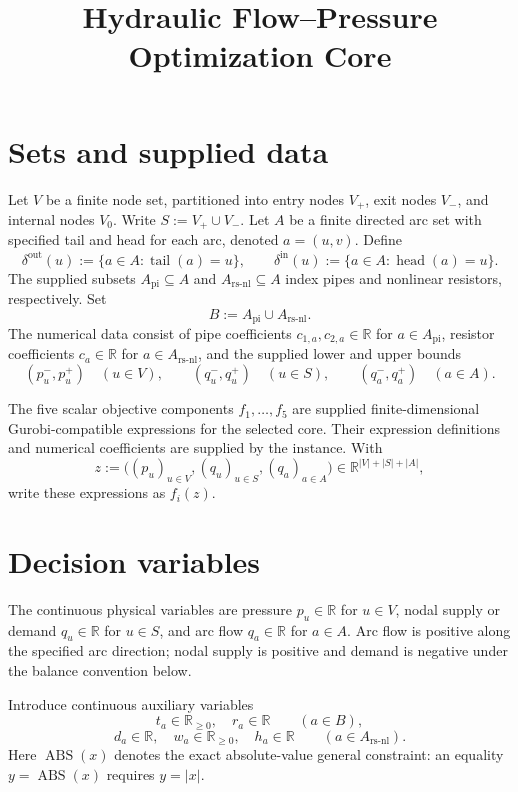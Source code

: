 \documentclass[11pt]{article}
\title{Hydraulic Flow--Pressure Optimization Core}
\author{}
\date{}
\begin{document}
\maketitle

\section{Sets and supplied data}
Let $V$ be a finite node set, partitioned into entry nodes $V_+$, exit nodes $V_-$, and internal nodes $V_0$. Write $S:=V_+\cup V_-$. Let $A$ be a finite directed arc set with specified tail and head for each arc, denoted $a=(u,v)$. Define
\[
\delta^{\mathrm{out}}(u):=\{a\in A:\operatorname{tail}(a)=u\},
\qquad
\delta^{\mathrm{in}}(u):=\{a\in A:\operatorname{head}(a)=u\}.
\]
The supplied subsets $A_{\mathrm{pi}}\subseteq A$ and $A_{\mathrm{rs\text{-}nl}}\subseteq A$ index pipes and nonlinear resistors, respectively. Set
\[
B:=A_{\mathrm{pi}}\cup A_{\mathrm{rs\text{-}nl}}.
\]
The numerical data consist of pipe coefficients $c_{1,a},c_{2,a}\in\mathbb R$ for $a\in A_{\mathrm{pi}}$, resistor coefficients $c_a\in\mathbb R$ for $a\in A_{\mathrm{rs\text{-}nl}}$, and the supplied lower and upper bounds
\[
(p_u^-,p_u^+)\quad(u\in V),\qquad
(q_u^-,q_u^+)\quad(u\in S),\qquad
(q_a^-,q_a^+)\quad(a\in A).
\]


The five scalar objective components $f_1,\ldots,f_5$ are supplied finite-dimensional Gurobi-compatible expressions for the selected core. Their expression definitions and numerical coefficients are supplied by the instance. With
\[
z:=\bigl((p_u)_{u\in V},(q_u)_{u\in S},(q_a)_{a\in A}\bigr)
\in\mathbb R^{|V|+|S|+|A|},
\]
write these expressions as $f_i(z)$.

\section{Decision variables}
The continuous physical variables are pressure $p_u\in\mathbb R$ for $u\in V$, nodal supply or demand $q_u\in\mathbb R$ for $u\in S$, and arc flow $q_a\in\mathbb R$ for $a\in A$. Arc flow is positive along the specified arc direction; nodal supply is positive and demand is negative under the balance convention below.

Introduce continuous auxiliary variables
\[
t_a\in\mathbb R_{\geq0},\quad r_a\in\mathbb R
\qquad(a\in B),
\]
\[
d_a\in\mathbb R,\quad w_a\in\mathbb R_{\geq0},\quad h_a\in\mathbb R
\qquad(a\in A_{\mathrm{rs\text{-}nl}}).
\]
Here $\operatorname{ABS}(x)$ denotes the exact absolute-value general constraint: an equality $y=\operatorname{ABS}(x)$ requires $y=|x|$.
\end{document}
